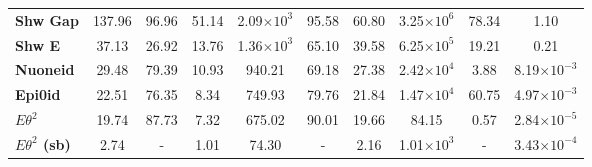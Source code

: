 \begin{table}[!hb]
\begin{tabular}{|l|ccc|ccc|ccc|}
\textbf{Shw Gap}          & 137.96            & 96.96                                                              & 51.14                                     & 2.09$\times 10^3$           & 95.58                                                               & 60.80                                      & 3.25$\times 10^6$          & 78.34                                                              & 1.10                                      \\
\textbf{Shw E}      & 37.13             & 26.92                                                              & 13.76                                     & 1.36$\times 10^3$           & 65.10                                                               & 39.58                                      & 6.25$\times 10^5$          & 19.21                                                              & 0.21                                      \\
\textbf{Nuoneid}      & 29.48             & 79.39                                                              & 10.93                                     & 940.21             & 69.18                                                               & 27.38                                      & 2.42$\times 10^4$ & 3.88                                                               & 8.19$\times 10^{-3}$                                  \\
\textbf{Epi0id}       & 22.51             & 76.35                                                              & 8.34                                      & 749.93             & 79.76                                                               & 21.84                                      & 1.47$\times 10^4$ & 60.75                                                              & 4.97$\times 10^{-3}$                                  \\
\rowcolor[HTML]{67FD9A}
\textbf{$E\theta^2$}      & 19.74             & 87.73                                                              & 7.32                                      & 675.02             & 90.01                                                               & 19.66                                      & 84.15             & 0.57                                                               & 2.84$\times 10^{-5}$                                 \\\hline\hline
\textbf{$E\theta^2$ (sb)}  & 2.74              & -                                                              & 1.01                                      & 74.30              & -                                                               & 2.16                                       & 1.01$\times 10^3$          & - & 3.43$\times 10^{-4}$                                  \\\hline\hline

\end{tabular}
\end{table}
